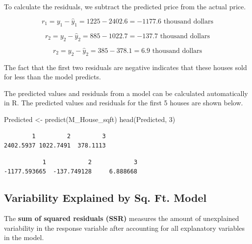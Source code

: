 \documentclass[
  letterpaper,
  DIV=11,
  numbers=noendperiod]{scrreprt}
\newenvironment{Shaded}{\begin{snugshade}}{\end{snugshade}}
\newcommand{\DecValTok}[1]{\textcolor[rgb]{0.68,0.00,0.00}{#1}}
\newcommand{\FunctionTok}[1]{\textcolor[rgb]{0.28,0.35,0.67}{#1}}
\newcommand{\NormalTok}[1]{\textcolor[rgb]{0.00,0.23,0.31}{#1}}
\newcommand{\OtherTok}[1]{\textcolor[rgb]{0.00,0.23,0.31}{#1}}
\newcommand{\SpecialCharTok}[1]{\textcolor[rgb]{0.37,0.37,0.37}{#1}}
\begin{document}
To calculate the residuals, we subtract the predicted price from the
actual price.

\[r_1 = y_1-\hat{y}_1 = 1225 - 2402.6 = -1177.6 \text{ thousand dollars}\]

\[r_2 = y_2-\hat{y}_2 = 885 - 1022.7 = -137.7 \text{ thousand dollars}\]

\[r_2 = y_2-\hat{y}_2 = 385 - 378.1 = 6.9 \text{ thousand dollars}\]

The fact that the first two residuals are negative indicates that these
houses sold for less than the model predicts.

The predicted values and residuals from a model can be calculated
automatically in R. The predicted values and residuals for the first 5
houses are shown below.

\begin{Shaded}
\begin{Highlighting}[]
\NormalTok{Predicted }\OtherTok{\textless{}{-}} \FunctionTok{predict}\NormalTok{(M\_House\_sqft)}
\FunctionTok{head}\NormalTok{(Predicted, }\DecValTok{3}\NormalTok{)}
\end{Highlighting}
\end{Shaded}

\begin{verbatim}
        1         2         3 
2402.5937 1022.7491  378.1113 
\end{verbatim}

\begin{Shaded}
\end{Shaded}

\begin{verbatim}
           1            2            3 
-1177.593665  -137.749128     6.888668 
\end{verbatim}

\subsection{Variability Explained by Sq. Ft.
Model}\label{variability-explained-by-sq.-ft.-model}

The \textbf{sum of squared residuals (SSR)} measures the amount of
unexplained variability in the response variable after accounting for
all explanatory variables in the model.
\end{document}

